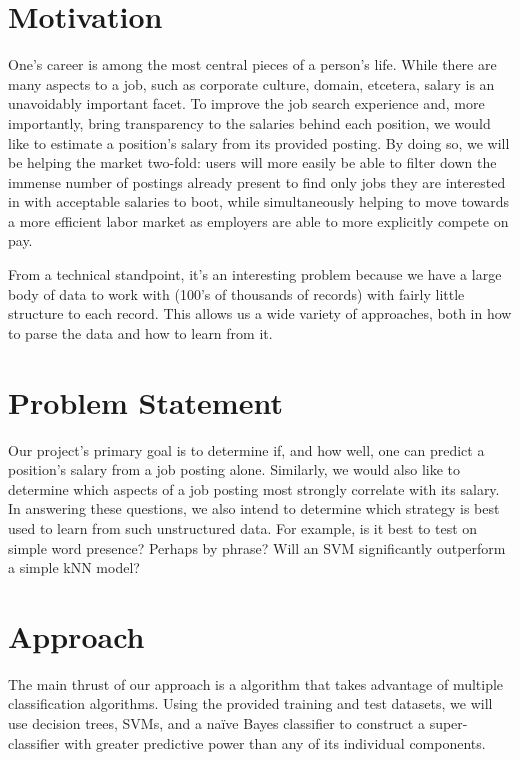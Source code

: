 \documentclass{pset}
\renewcommand\maketitle{
  \vspace*{-5em}
  \begin{center}\framebox{\parbox{\boxlength}{\bf
    CS 4780, Fall 2013\hfill Project Proposal\hfill 22 October 2013
  }}
  \end{center}
  \vspace{1em}
}
\begin{document}
\maketitle

\section*{Motivation}

One's career is among the most central pieces of a person's life. While there
are many aspects to a job, such  as corporate culture, domain, etcetera, salary
 is an unavoidably important facet. To improve the job search experience and,
more importantly, bring transparency to the salaries behind each position, we
would like to estimate a position's salary from its provided posting. By doing
so, we will be helping the market two-fold: users will more easily be able to
filter down the immense number of postings already present to find only jobs
they are interested in with acceptable salaries to boot, while simultaneously
helping to move towards a more efficient labor market as employers are able to
more explicitly compete on pay.

From a technical standpoint, it's an interesting problem because we have a
large body of data to work with (100's of thousands of records) with fairly
little structure to each record. This allows us a wide variety of approaches,
both in how to parse the data and how to learn from it.

\section*{Problem Statement}

Our project's primary goal is to determine if, and how well, one can predict a
position's salary from a job posting alone. Similarly, we would also like to
determine which aspects of a job posting most strongly correlate with its
salary. In answering these questions, we also intend to determine which
strategy is best used to learn from such unstructured data. For example, is it
best to test on simple word presence? Perhaps by phrase? Will an SVM
significantly outperform a simple kNN model?

\section*{Approach}

The main thrust of our approach is a
algorithm that takes advantage of multiple classification algorithms. Using the
provided training and test datasets, we will use decision trees, SVMs, and a
naïve Bayes classifier to construct a super-classifier with greater predictive
power than any of its individual components.
\end{document}
